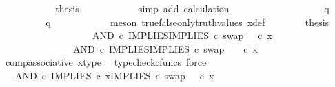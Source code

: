 \begin{isabellebody}
\ \ \ \ \ \ \ \ \isamarkupfalse%
\ \isamarkupfalse%
\ {\isacharquery}{\kern0pt}thesis\isanewline
\ \ \ \ \ \ \ \ \ \ \isamarkupfalse%
\ {\isacharparenleft}{\kern0pt}simp\ add{\isacharcolon}{\kern0pt}\ calculation{\isacharparenright}{\kern0pt}\isanewline
\ \ \ \ \ \ \isamarkupfalse%
\isanewline
\ \ \ \ \isamarkupfalse%
\isanewline
\ \ \ \ \ \ \isamarkupfalse%
\ {\isachardoublequoteopen}q\ {\isasymnoteq}\ {\isasymt}{\isachardoublequoteclose}\isanewline
\ \ \ \ \ \ \isamarkupfalse%
\ \isamarkupfalse%
\ {\isachardoublequoteopen}q\ {\isacharequal}{\kern0pt}\ {\isasymf}{\isachardoublequoteclose}\isanewline
\ \ \ \ \ \ \ \ \isamarkupfalse%
\ {\isacharparenleft}{\kern0pt}meson\ true{\isacharunderscore}{\kern0pt}false{\isacharunderscore}{\kern0pt}only{\isacharunderscore}{\kern0pt}truth{\isacharunderscore}{\kern0pt}values\ x{\isacharunderscore}{\kern0pt}def{\isacharparenright}{\kern0pt}\isanewline
\ \ \ \ \ \ \isamarkupfalse%
\ {\isacharquery}{\kern0pt}thesis\isanewline
\ \ \ \ \ \ \isamarkupfalse%
\ {\isacharminus}{\kern0pt}\ \isanewline
\ \ \ \ \ \ \ \ \isamarkupfalse%
\ {\isachardoublequoteopen}{\isacharparenleft}{\kern0pt}AND\ {\isasymcirc}\isactrlsub c\ {\isasymlangle}IMPLIES{\isacharcomma}{\kern0pt}IMPLIES\ {\isasymcirc}\isactrlsub c\ swap\ {\isasymOmega}\ {\isasymOmega}{\isasymrangle}{\isacharparenright}{\kern0pt}\ {\isasymcirc}\isactrlsub c\ x\ {\isacharequal}{\kern0pt}\ \ \ \ \isanewline
\ \ \ \ \ \ \ \ \ \ \ \ \ \ \ AND\ {\isasymcirc}\isactrlsub c\ {\isasymlangle}IMPLIES{\isacharcomma}{\kern0pt}IMPLIES\ {\isasymcirc}\isactrlsub c\ swap\ {\isasymOmega}\ {\isasymOmega}{\isasymrangle}\ \ {\isasymcirc}\isactrlsub c\ x{\isachardoublequoteclose}\isanewline
\ \ \ \ \ \ \ \ \ \ \isamarkupfalse%
\ comp{\isacharunderscore}{\kern0pt}associative{}\ x{\isacharunderscore}{\kern0pt}type\ \isamarkupfalse%
\ {\isacharparenleft}{\kern0pt}typecheck{\isacharunderscore}{\kern0pt}cfuncs{\isacharcomma}{\kern0pt}\ force{\isacharparenright}{\kern0pt}\isanewline
\ \ \ \ \ \ \ \ \isamarkupfalse%
\ \isamarkupfalse%
\ {\isachardoublequoteopen}{\isachardot}{\kern0pt}{\isachardot}{\kern0pt}{\isachardot}{\kern0pt}\ {\isacharequal}{\kern0pt}\ AND\ {\isasymcirc}\isactrlsub c\ {\isasymlangle}IMPLIES\ {\isasymcirc}\isactrlsub c\ x{\isacharcomma}{\kern0pt}IMPLIES\ {\isasymcirc}\isactrlsub c\ swap\ {\isasymOmega}\ {\isasymOmega}\ {\isasymcirc}\isactrlsub c\ x{\isasymrangle}{\isachardoublequoteclose}\isanewline

\end{isabellebody}
